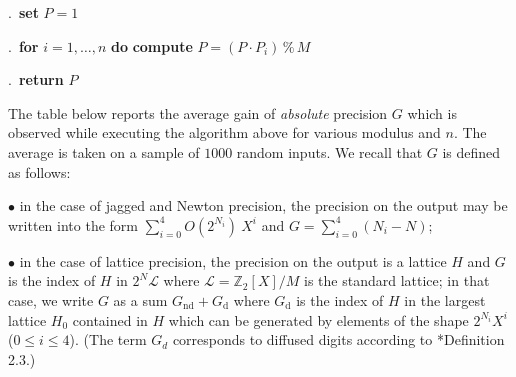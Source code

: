\documentclass{sig-alternate-2013}
\newcommand{\Z}{\mathbb Z}
\renewcommand{\mod}{\,\%\,}
\begin{document}
\noindent\hrulefill

%

.\ {\bf set} $P = 1$

.\ {\bf for} $i=1,\dots,n$ {\bf do} {\bf compute} $P = (P 
\cdot P_i) \mod M$

.\ {\bf return} $P$

\vspace{-1ex}\noindent\hrulefill

\medskip

The table below reports the average gain of \emph{absolute} 
precision $G$ which is observed while executing the algorithm above 
for various modulus and $n$. The average is taken on a sample of $1000$ 
random inputs. We recall that $G$ is defined as follows:

\noindent $\bullet$
in the case of jagged and Newton precision, the precision on the output 
may be written into the form $\sum_{i=0}^4 O(2^{N_i}) \: X^i$ and 
$G = \sum_{i=0}^4 (N_i - N)$;

\noindent $\bullet$
in the case of lattice precision, the precision on the output is a 
lattice $H$ and $G$ is the index of $H$ in $2^N \mathcal L$ where 
$\mathcal L = \Z_2[X]/M$ is the standard lattice; in that case, we write 
$G$ as a sum $G_{\text{nd}} + G_{\text{d}}$ where $G_{\text{d}}$ is the 
index of $H$ in the largest lattice $H_0$ contained in $H$ which can be 
generated by elements of the shape $2^{N_i} X^i$ ($0 \leq i \leq 4$). 
(The term $G_d$ corresponds to diffused digits according to 
\cite{caruso-roe-vaccon:15a}*{Definition 2.3}.)

\medskip
\end{document}
